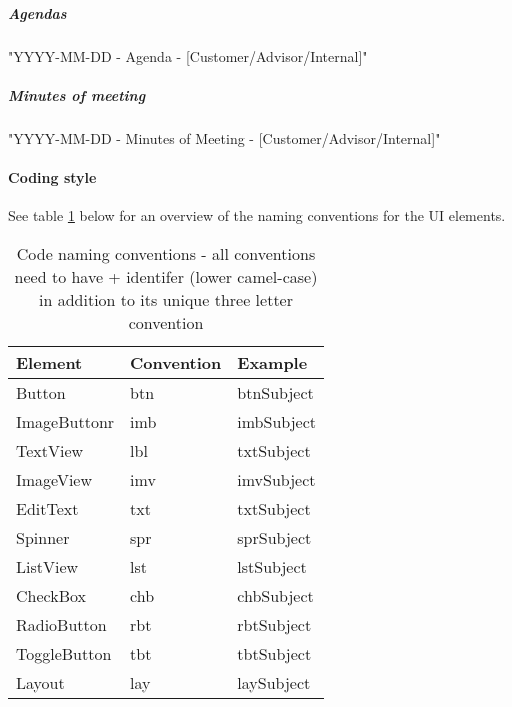 \subparagraph{Agendas}\hfill
\newline
"YYYY-MM-DD - Agenda - [Customer/Advisor/Internal]"

\subparagraph{Minutes of meeting}\hfill
\newline
"YYYY-MM-DD - Minutes of Meeting - [Customer/Advisor/Internal]"

\newpage

\paragraph{Coding style}\hfill
\newline
See table \ref{tab:namingconventions} below for an overview of the naming conventions for the UI elements.
\begin{table}[h!]
\begin{center}
\begin{tabular}{l|l|l} \hline
\textbf{Element} & \textbf{Convention} & \textbf{Example} \\ \hline \hline
Button & btn & btnSubject \\
ImageButtonr & imb & imbSubject \\
TextView & lbl & txtSubject \\
ImageView & imv & imvSubject \\
EditText & txt & txtSubject \\
Spinner & spr & sprSubject \\
ListView & lst & lstSubject \\
CheckBox & chb & chbSubject \\
RadioButton & rbt & rbtSubject \\
ToggleButton & tbt & tbtSubject \\
Layout & lay & laySubject \\ \hline 
\end{tabular}
\end{center}
\caption{Code naming conventions - all conventions need to have + identifer (lower camel-case) in addition to its unique three letter convention }\label{tab:namingconventions}
\end{table}

